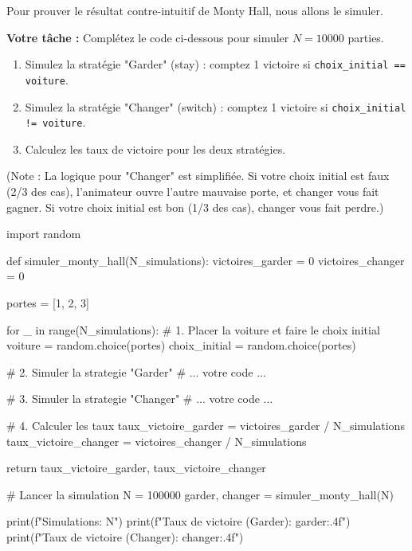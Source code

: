 \begin{exercicebox}
Pour prouver le résultat contre-intuitif de Monty Hall, nous allons le simuler.

\textbf{Votre tâche :}
Complétez le code ci-dessous pour simuler $N=10000$ parties.
\begin{enumerate}
    \item Simulez la stratégie "Garder" (stay) : comptez 1 victoire si \texttt{choix\_initial == voiture}.
    \item Simulez la stratégie "Changer" (switch) : comptez 1 victoire si \texttt{choix\_initial != voiture}.
    \item Calculez les taux de victoire pour les deux stratégies.
\end{enumerate}
(Note : La logique pour "Changer" est simplifiée. Si votre choix initial est faux (2/3 des cas), l'animateur ouvre l'autre mauvaise porte, et changer vous fait gagner. Si votre choix initial est bon (1/3 des cas), changer vous fait perdre.)

\begin{codecell}
import random

def simuler_monty_hall(N_simulations):
    victoires_garder = 0
    victoires_changer = 0
    
    portes = [1, 2, 3]
    
    for _ in range(N_simulations):
        # 1. Placer la voiture et faire le choix initial
        voiture = random.choice(portes)
        choix_initial = random.choice(portes)
        
        # 2. Simuler la strategie "Garder"
        # ... votre code ...
            
        # 3. Simuler la strategie "Changer"
        # ... votre code ...
            
    # 4. Calculer les taux
    taux_victoire_garder = victoires_garder / N_simulations
    taux_victoire_changer = victoires_changer / N_simulations
    
    return taux_victoire_garder, taux_victoire_changer

# Lancer la simulation
N = 100000
garder, changer = simuler_monty_hall(N)

print(f"Simulations: {N}")
print(f"Taux de victoire (Garder): {garder:.4f}")
print(f"Taux de victoire (Changer): {changer:.4f}")
\end{codecell}
\end{exercicebox}




